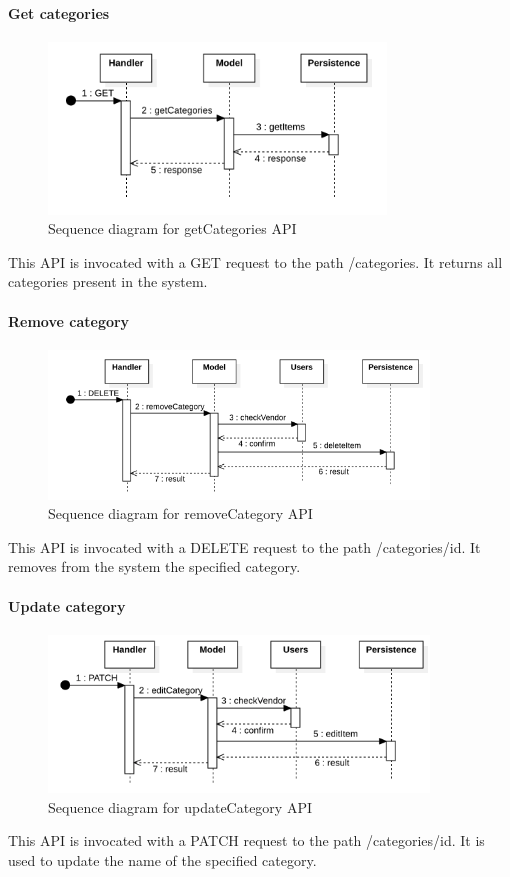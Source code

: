 \paragraph*{Get categories}
\begin{figure}[H]
    \includegraphics[width=0.8\textwidth]{res/images/sequence-diagrams/categories/getCategories.png}
    \caption{Sequence diagram for getCategories API}
\end{figure}
This API is invocated with a GET request to the path /categories. It returns all categories present in the system.

\paragraph*{Remove category}
\begin{figure}[H]
    \includegraphics[width=0.9\textwidth]{res/images/sequence-diagrams/categories/removeCategory.png}
    \caption{Sequence diagram for removeCategory API}
\end{figure}
This API is invocated with a DELETE request to the path /categories/{id}. It removes from the system the specified category.

\paragraph*{Update category}
\begin{figure}[H]
    \includegraphics[width=0.9\textwidth]{res/images/sequence-diagrams/categories/updateCategory.png}
    \caption{Sequence diagram for updateCategory API}
\end{figure}
This API is invocated with a PATCH request to the path /categories/{id}. It is used to update the name of the specified category.


